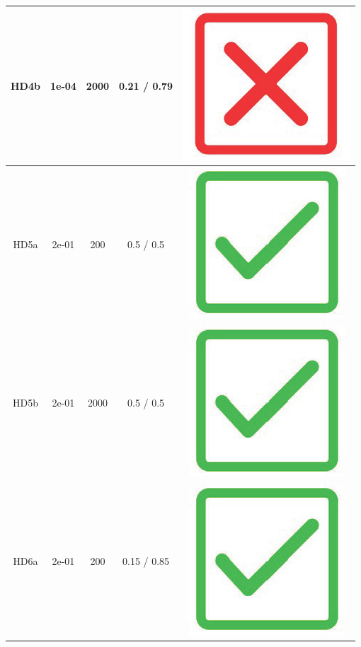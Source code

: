 \begin{table}[!h]
{\begin{tabular}[t]{ccccc}
\midrule
HD4b & 1e-04 & 2000 & 0.21 / 0.79 & \includegraphics[scale=0.05]{figures/red_cross.png}\\
\midrule
HD5a & 2e-01 & 200 & 0.5 / 0.5 & \includegraphics[scale=0.05]{figures/green_tick.png}\\
\midrule
HD5b & 2e-01 & 2000 & 0.5 / 0.5 & \includegraphics[scale=0.05]{figures/green_tick.png}\\
\midrule
\addlinespace
HD6a & 2e-01 & 200 & 0.15 / 0.85 & \includegraphics[scale=0.05]{figures/green_tick.png}\\

\end{tabular}}
\end{table}
